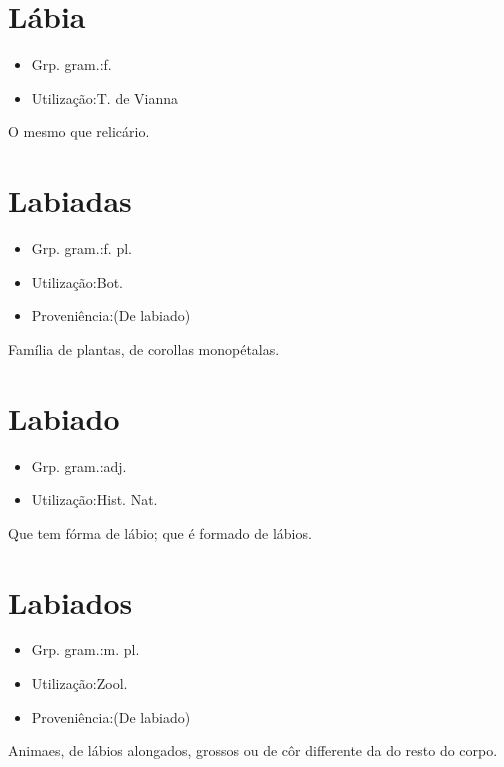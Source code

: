 \section{Lábia}
\begin{itemize}
\item {Grp. gram.:f.}
\end{itemize}
\begin{itemize}
\item {Utilização:T. de Vianna}
\end{itemize}
O mesmo que \textunderscore relicário\textunderscore .
\section{Labiadas}
\begin{itemize}
\item {Grp. gram.:f. pl.}
\end{itemize}
\begin{itemize}
\item {Utilização:Bot.}
\end{itemize}
\begin{itemize}
\item {Proveniência:(De \textunderscore labiado\textunderscore )}
\end{itemize}
Família de plantas, de corollas monopétalas.
\section{Labiado}
\begin{itemize}
\item {Grp. gram.:adj.}
\end{itemize}
\begin{itemize}
\item {Utilização:Hist. Nat.}
\end{itemize}
Que tem fórma de lábio; que é formado de lábios.
\section{Labiados}
\begin{itemize}
\item {Grp. gram.:m. pl.}
\end{itemize}
\begin{itemize}
\item {Utilização:Zool.}
\end{itemize}
\begin{itemize}
\item {Proveniência:(De \textunderscore labiado\textunderscore )}
\end{itemize}
Animaes, de lábios alongados, grossos ou de côr differente da do resto do corpo.
